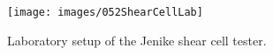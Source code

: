 \begin{figure}[!htb]
\centering
\texttt{[image: images/052ShearCellLab]}
\caption[JSCT]{Laboratory setup of the Jenike shear cell tester.}
\label{fig:052ShearCellLab}
\end{figure}